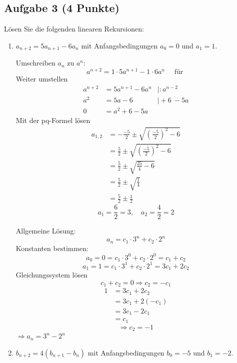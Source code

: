 \documentclass{article} %
\begin{document}
\subsection*{Aufgabe 3 (4 Punkte)}  
Lösen Sie die folgenden linearen Rekursionen:
\begin{enumerate}
    \item $a_{n+2} = 5a_{n+1} - 6a_n$ mit Anfangsbedingungen $a_0 = 0$ und $a_1 = 1$.
    \begin{mybox}
    Umschreiben $a_n$ zu $a^n$: 
    \[
    a^{n+2} = 1 \cdot 5a^{n+1} - 1 \cdot 6a^n \quad \text{ für } 
    \]
    Weiter umstellen 
    \begin{align*}
        a^{n+2} & = 5a^{n+1} - 6a^n & \mid :a^{n-2} \\
    a^{2} & =  5a - 6 & \mid +6 \ -5a \\ 
    0 & = a^2 +6 - 5a
    \end{align*}
    Mit der pq-Formel lösen 
    \begin{align*}
        a_{1,2} &= -\frac{-5}{2} \pm \sqrt{(\frac{-5}{2})^2 - 6} \\
        & = \frac{5}{2} \pm \sqrt{(\frac{-5}{2})^2 - 6} \\
        & = \frac{5}{2} \pm \sqrt{\frac{25}{4} - 6}
        \\
        & = \frac{5}{2} \pm \sqrt{\frac{1}{4}} \\
        & = \frac{5}{2} \pm \frac{1}{2}
    \end{align*}
    \[
   a_1 = \frac{6}{2} = 3, \quad a_2 = \frac{4}{2} = 2 
    \]
    \end{mybox}
    \begin{mybox}
    Allgemeine Lösung: 
    \[
    a_n = c_1 \cdot 3^n + c_2 \cdot 2^n
    \]
    Konstanten bestimmen: 
    \[
    a_0 = 0 = c_1 \cdot 3^0 + c_2 \cdot 2^0 = c_1 + c_2 
    \]
    \[
    a_1 =1= c_1 \cdot 3^1 + c_2 \cdot 2^1 = 3c_1 + 2c_2
    \]
    Gleichungssystem lösen
    \[
    c_1 + c_2  = 0 \Rightarrow c_2 = -c_1
    \]
    \begin{align*}
        1 & = 3c_1 + 2c_2 \\
         & = 3c_1 + 2(-c_1) \\
         & = 3c_1 - 2c_1 \\
         & = c_1
    \end{align*}
    \[
    \Rightarrow c_2 = -1
    \]
    $\Rightarrow a_n = 3^n - 2^n$
    \end{mybox}
    \item $b_{n+2} = 4(b_{n+1} - b_n)$ mit Anfangsbedingungen $b_0 = -5$ und $b_1 = -2$.

\end{enumerate}
\end{document}
